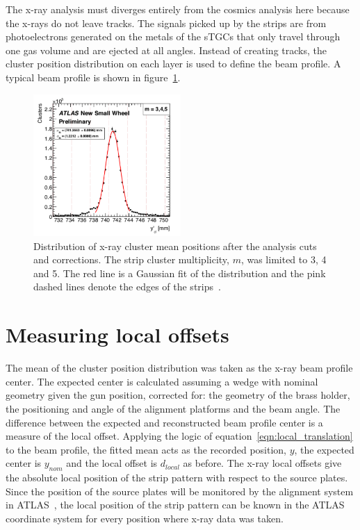 The x-ray analysis must diverges entirely from the cosmics analysis here because the x-rays do not leave tracks. The signals picked up by the strips are from photoelectrons generated on the metals of the sTGCs that only travel through one gas volume and are ejected at all angles. Instead of creating tracks, the cluster position distribution on each layer is used to define the beam profile. A typical beam profile is shown in figure~\ref{fig:xray_beam_profile}.

\begin{figure}
    \centering
    \includegraphics[width = 0.5\textwidth]{figures/figure_xray_beam_profile.pdf}
    \caption{Distribution of x-ray cluster mean positions after the analysis cuts and corrections. The strip cluster multiplicity, $m$, was limited to 3, 4 and 5. The red line is a Gaussian fit of the distribution and the pink dashed lines denote the edges of the strips~\cite{lefebvre_precision_2020}.}
    \label{fig:xray_beam_profile}
\end{figure}

\section{Measuring local offsets}
The mean of the cluster position distribution was taken as the x-ray beam profile center. The expected center is calculated assuming a wedge with nominal geometry given the gun position, corrected for: the geometry of the brass holder, the positioning and angle of the alignment platforms and the beam angle. The difference between the expected and reconstructed beam profile center is a measure of the local offset. Applying the logic of equation~\ref{eqn:local_translation} to the beam profile, the fitted mean acts as the recorded position, $y$, the expected center is $y_{nom}$ and the local offset is $d_{local}$ as before. The x-ray local offsets give the absolute local position of the strip pattern with respect to the source plates. Since the position of the source plates will be monitored by the alignment system in ATLAS~\cite{nsw_tdr}, the local position of the strip pattern can be known in the ATLAS coordinate system for every position where x-ray data was taken.

